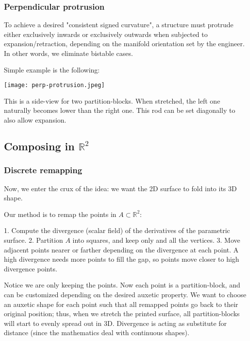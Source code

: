 \documentclass{article}
\begin{document}
\subsubsection{Perpendicular protrusion}
To achieve a desired "consistent signed curvature", a structure must protrude either exclusively inwards or exclusively outwards when subjected to expansion/retraction, depending on the manifold orientation set by the engineer. In other words, we eliminate bistable cases.

Simple example is the following:

\vspace{5mm}

\texttt{[image: perp-protrusion.jpeg]}

\vspace{5mm}

This is a side-view for two partition-blocks. When stretched, the left one naturally becomes lower than the right one. This rod can be set diagonally to also allow expansion.

\subsection{Composing in $\mathbb{R}^2$}

\subsubsection{Discrete remapping}
Now, we enter the crux of the idea: we want the 2D surface to fold into its 3D shape.

Our method is to remap the points in $A \subset \mathbb{R}^2$:

1. Compute the divergence (scalar field) of the derivatives of the parametric surface.
2. Partition $A$ into squares, and keep only and all the vertices.
3. Move adjacent points nearer or farther depending on the divergence at each point. A high divergence needs more points to fill the gap, so points move closer to high divergence points.

Notice we are only keeping the points. Now each point is a partition-block, and can be customized depending on the desired auxetic property. We want to choose an auxetic shape for each point such that all remapped points go back to their original position; thus, when we stretch the printed surface, all partition-blocks will start to evenly spread out in 3D. Divergence is acting as substitute for distance (since the mathematics deal with continuous shapes).
\end{document}
